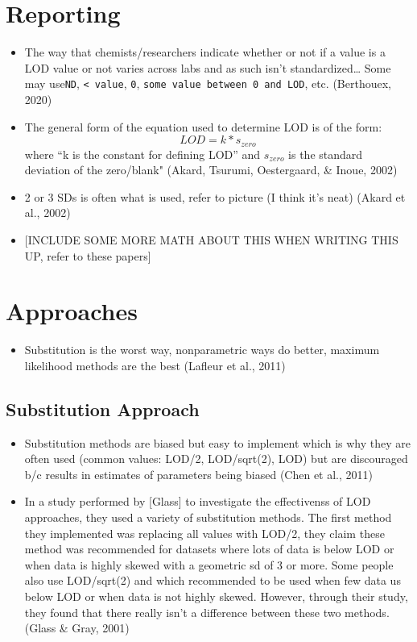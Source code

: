 \documentclass[12pt, twoside]{amherstthesis}
\providecommand{\tightlist}{%
  \setlength{\itemsep}{0pt}\setlength{\parskip}{0pt}}
\begin{document}
\hypertarget{reporting}{%
\section{Reporting}\label{reporting}}
\begin{itemize}
\item
  The way that chemists/researchers indicate whether or not if a value is a LOD value or not varies across labs and as such isn't standardized\ldots{} Some may use\texttt{ND}, \texttt{\textless{}\ value}, \texttt{0}, \texttt{some\ value\ between\ 0\ and\ LOD}, etc. (Berthouex, 2020)
\item
  The general form of the equation used to determine LOD is of the form:
  \[LOD = k * s_{zero}\]
  where ``k is the constant for defining LOD'' and \(s_{zero}\) is the standard deviation of the zero/blank" (Akard, Tsurumi, Oestergaard, \& Inoue, 2002)
\item
  2 or 3 SDs is often what is used, refer to picture (I think it's neat) (Akard et al., 2002)
\item
  {[}INCLUDE SOME MORE MATH ABOUT THIS WHEN WRITING THIS UP, refer to these papers{]}
\end{itemize}
\hypertarget{Approaches}{%
\section{Approaches}\label{Approaches}}
\begin{itemize}
\tightlist
\item
  Substitution is the worst way, nonparametric ways do better, maximum likelihood methods are the best (Lafleur et al., 2011)
\end{itemize}
\hypertarget{Substitution}{%
\subsection{Substitution Approach}\label{Substitution}}
\begin{itemize}
\item
  Substitution methods are biased but easy to implement which is why they are often used (common values: LOD/2, LOD/sqrt(2), LOD) but are discouraged b/c results in estimates of parameters being biased (Chen et al., 2011)
\item
  In a study performed by {[}Glass{]} to investigate the effectivenss of LOD approaches, they used a variety of substitution methods. The first method they implemented was replacing all values with LOD/2, they claim these method was recommended for datasets where lots of data is below LOD or when data is highly skewed with a geometric sd of 3 or more. Some people also use LOD/sqrt(2) and which recommended to be used when few data us below LOD or when data is not highly skewed. However, through their study, they found that there really isn't a difference between these two methods. (Glass \& Gray, 2001)
\end{itemize}
\end{document}
